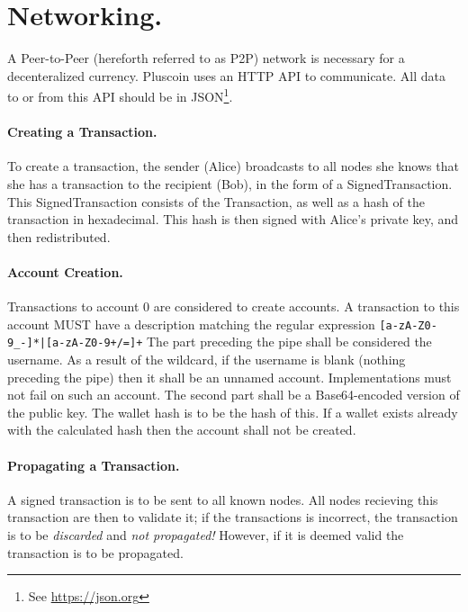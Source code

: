 \documentclass{article}
\begin{document}
\label{net}
\section{Networking.}
A Peer-to-Peer (hereforth referred to as P2P) network is necessary for a
decenteralized currency. Pluscoin uses an HTTP API to communicate. All data to
or from this API should be in JSON\footnote{See \url{https://json.org}}.

\paragraph{Creating a Transaction.} To create a transaction, the sender (Alice)
broadcasts to all nodes she knows that she has a transaction to the recipient
(Bob), in the form of a SignedTransaction. This SignedTransaction consists of
the Transaction, as well as a hash of the transaction in hexadecimal. This hash is
then signed with Alice's private key, and then redistributed.

\paragraph{Account Creation.} Transactions to account 0 are considered to
create accounts. A transaction to this account MUST have a
description matching the regular expression \verb~[a-zA-Z0-9_-]*|[a-zA-Z0-9+/=]+~
The part preceding the pipe shall be considered the username. As a result of
the wildcard, if the username is blank (nothing preceding the pipe) then it
shall be an unnamed account. Implementations must not fail on such an account.
The second part shall be a Base64-encoded version of the public key. The
wallet hash is to be the hash of this. If a wallet exists already with the
calculated hash then the account shall not be created.

\label{prop}
\paragraph{Propagating a Transaction.} A signed transaction is to be sent to all
known nodes. All nodes recieving this transaction are then to validate
it; if the transactions is incorrect, the transaction is to be {\it{discarded}}
and {\it{not propagated!}} However, if it is deemed valid the transaction is to
be propagated.
\end{document}
